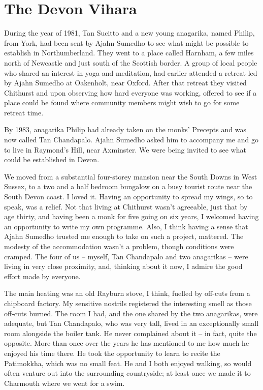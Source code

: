 \chapter{The Devon Vihara}

During the year of 1981, Tan Sucitto and a new young anagarika, named Philip,
from York, had been sent by Ajahn Sumedho to see what might be possible to
establish in Northumberland. They went to a place called Harnham, a
few miles north of Newcastle and just south of the Scottish border. A
group of local people who shared an interest in yoga and meditation, had
earlier attended a retreat led by Ajahn Sumedho at Oakenholt, near
Oxford. After that retreat they visited Chithurst and upon observing how
hard everyone was working, offered to see if a place could be found
where community members might wish to go for some retreat time.

By 1983, anagarika Philip had already taken on the monks' Precepts and
was now called Tan Chandapalo. Ajahn Sumedho asked him to accompany me
and go to live in Raymond's Hill, near Axminster. We were being invited
to see what could be established in Devon.

We moved from a substantial four-storey mansion near the South Downs in
West Sussex, to a two and a half bedroom bungalow on a busy tourist
route near the South Devon coast. I loved it. Having an opportunity to
spread my wings, so to speak, was a relief. Not that living at Chithurst
wasn't agreeable, just that by age thirty, and having been a monk for
five going on six years, I welcomed having an opportunity to write my
own programme. Also, I think having a sense that Ajahn Sumedho trusted
me enough to take on such a project, mattered. The modesty of the
accommodation wasn't a problem, though conditions were cramped. The four
of us -- myself, Tan Chandapalo and two anagarikas -- were living in
very close proximity, and, thinking about it now, I admire the good
effort made by everyone.

The main heating was an old Rayburn stove, I think, fuelled by off-cuts
from a chipboard factory. My sensitive nostrils registered the
interesting smell as those off-cuts burned. The room I had, and the one
shared by the two anagarikas, were adequate, but Tan Chandapalo, who was
very tall, lived in an exceptionally small room alongside the boiler
tank. He never complained about it -- in fact, quite the opposite. More
than once over the years he has mentioned to me how much he enjoyed his
time there. He took the opportunity to learn to recite the Patimokkha,
which was no small feat. He and I both enjoyed walking, so would often
venture out into the surrounding countryside; at least once we made it
to Charmouth where we went for a swim.

